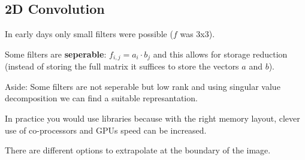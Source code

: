 \subsection*{2D Convolution}
In early days only small filters were possible (\eg $f$ was 3x3).

Some filters are \textbf{seperable}: $f_{i,j} = a_i \cdot b_j$ and
this allows for storage reduction (instead of storing the full matrix
it suffices to store the vectors $a$ and $b$).

Aside: Some filters are not seperable but low rank and using singular
value decomposition we can find a suitable represantation.

In practice you would use libraries because with the right memory
layout, clever use of co-processors and GPUs speed can be increased.

There are different options to extrapolate at the boundary of the
image.
